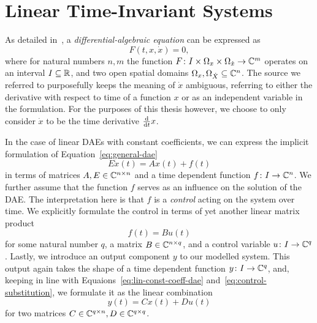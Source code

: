 \section{Linear Time-Invariant Systems}\label{sec:ltis}

As detailed in~\cite{Kunkel2006}, a \emph{differential-algebraic equation} can be expressed as
\begin{equation}\label{eq:general-dae}
    F(t, x, \dot{x}) = 0,
\end{equation}
where for natural numbers $n, m$ the function $F \colon I \times \Omega_x \times \Omega_{\dot{x}} \to \mathbb{C}^m$ operates on an interval $I \subseteq \mathbb{R}$, and two open spatial domains $\Omega_x, \Omega_{\dot{X}} \subseteq \mathbb{C}^n$.
The source we referred to purposefully keeps the meaning of $\dot{x}$ ambiguous, referring to either the derivative with respect to time of a function $x$ or as an independent variable in the formulation.
For the purposes of this thesis however, we choose to only consider $\dot{x}$ to be the time derivative $\frac{\mathop{}\!\mathrm{d}}{\mathop{}\!\mathrm{d} t} x$.

In the case of linear DAEs with constant coefficients, we can express the implicit formulation of Equation~\eqref{eq:general-dae}
\begin{equation}\label{eq:lin-const-coeff-dae}
    E \dot{x}(t) = A x(t) + f(t)
\end{equation}
in terms of matrices $A, E \in \mathbb{C}^{n \times n}$ and a time dependent function $f \colon I \to \mathbb{C}^n$.
We further assume that the function $f$ serves as an influence on the solution of the DAE.\@
The interpretation here is that $f$ is a \emph{control} acting on the system over time.
We explicitly formulate the control in terms of yet another linear matrix product
\begin{equation}\label{eq:control-substitution}
    f(t) = B u(t)
\end{equation}
for some natural number $q$, a matrix $B \in \mathbb{C}^{n \times q}$, and a control variable $u \colon I \to \mathbb{C}^q$.
Lastly, we introduce an output component $y$ to our modelled system.
This output again takes the shape of a time dependent function $y \colon I \to \mathbb{C}^q$, and, keeping in line with Equaions~\eqref{eq:lin-const-coeff-dae} and~\eqref{eq:control-substitution}, we formulate it as the linear combination
\begin{equation}\label{eq:output-definition}
    y(t) = C x(t) + D u(t)
\end{equation}
for two matrices $C \in \mathbb{C}^{q \times n}, D \in \mathbb{C}^{q \times q}$.


